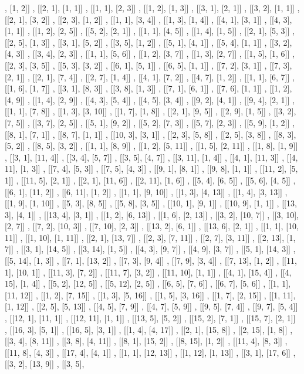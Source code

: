 \documentclass[a4paper, 12pt]{article}
\begin{document}
\begin{footnotesize}
[[1, 1], [1, 2]] , [[2, 1], [1, 1]] , [[1, 1], [2, 3]] , [[1, 2], [1, 3]] , [[3, 1], [2, 1]] , [[3, 2], [1, 1]] , [[2, 1], [3, 2]] , [[2, 3], [1, 2]] , [[1, 1], [3, 4]] , [[1, 3], [1, 4]] , [[4, 1], [3, 1]] , [[4, 3], [1, 1]] , [[1, 2], [2, 5]] , [[5, 2], [2, 1]] , [[1, 1], [4, 5]] , [[1, 4], [1, 5]] , [[2, 1], [5, 3]] , [[2, 5], [1, 3]] , [[3, 1], [5, 2]] , [[3, 5], [1, 2]] , [[5, 1], [4, 1]] , [[5, 4], [1, 1]] , [[3, 2], [4, 3]] , [[3, 4], [2, 3]] , [[1, 1], [5, 6]] , [[1, 2], [3, 7]] , [[1, 3], [2, 7]] , [[1, 5], [1, 6]] , [[2, 3], [3, 5]] , [[5, 3], [3, 2]] , [[6, 1], [5, 1]] , [[6, 5], [1, 1]] , [[7, 2], [3, 1]] , [[7, 3], [2, 1]] , [[2, 1], [7, 4]] , [[2, 7], [1, 4]] , [[4, 1], [7, 2]] , [[4, 7], [1, 2]] , [[1, 1], [6, 7]] , [[1, 6], [1, 7]] , [[3, 1], [8, 3]] , [[3, 8], [1, 3]] , [[7, 1], [6, 1]] , [[7, 6], [1, 1]] , [[1, 2], [4, 9]] , [[1, 4], [2, 9]] , [[4, 3], [5, 4]] , [[4, 5], [3, 4]] , [[9, 2], [4, 1]] , [[9, 4], [2, 1]] , [[1, 1], [7, 8]] , [[1, 3], [3, 10]] , [[1, 7], [1, 8]] , [[2, 1], [9, 5]] , [[2, 9], [1, 5]] , [[3, 2], [7, 5]] , [[3, 7], [2, 5]] , [[5, 1], [9, 2]] , [[5, 2], [7, 3]] , [[5, 7], [2, 3]] , [[5, 9], [1, 2]] , [[8, 1], [7, 1]] , [[8, 7], [1, 1]] , [[10, 3], [3, 1]] , [[2, 3], [5, 8]] , [[2, 5], [3, 8]] , [[8, 3], [5, 2]] , [[8, 5], [3, 2]] , [[1, 1], [8, 9]] , [[1, 2], [5, 11]] , [[1, 5], [2, 11]] , [[1, 8], [1, 9]] , [[3, 1], [11, 4]] , [[3, 4], [5, 7]] , [[3, 5], [4, 7]] , [[3, 11], [1, 4]] , [[4, 1], [11, 3]] , [[4, 11], [1, 3]] , [[7, 4], [5, 3]] , [[7, 5], [4, 3]] , [[9, 1], [8, 1]] , [[9, 8], [1, 1]] , [[11, 2], [5, 1]] , [[11, 5], [2, 1]] , [[2, 1], [11, 6]] , [[2, 11], [1, 6]] , [[5, 4], [6, 5]] , [[5, 6], [4, 5]] , [[6, 1], [11, 2]] , [[6, 11], [1, 2]] , [[1, 1], [9, 10]] , [[1, 3], [4, 13]] , [[1, 4], [3, 13]] , [[1, 9], [1, 10]] , [[5, 3], [8, 5]] , [[5, 8], [3, 5]] , [[10, 1], [9, 1]] , [[10, 9], [1, 1]] , [[13, 3], [4, 1]] , [[13, 4], [3, 1]] , [[1, 2], [6, 13]] , [[1, 6], [2, 13]] , [[3, 2], [10, 7]] , [[3, 10], [2, 7]] , [[7, 2], [10, 3]] , [[7, 10], [2, 3]] , [[13, 2], [6, 1]] , [[13, 6], [2, 1]] , [[1, 1], [10, 11]] , [[1, 10], [1, 11]] , [[2, 1], [13, 7]] , [[2, 3], [7, 11]] , [[2, 7], [3, 11]] , [[2, 13], [1, 7]] , [[3, 1], [14, 5]] , [[3, 14], [1, 5]] , [[4, 3], [9, 7]] , [[4, 9], [3, 7]] , [[5, 1], [14, 3]] , [[5, 14], [1, 3]] , [[7, 1], [13, 2]] , [[7, 3], [9, 4]] , [[7, 9], [3, 4]] , [[7, 13], [1, 2]] , [[11, 1], [10, 1]] , [[11, 3], [7, 2]] , [[11, 7], [3, 2]] , [[11, 10], [1, 1]] , [[4, 1], [15, 4]] , [[4, 15], [1, 4]] , [[5, 2], [12, 5]] , [[5, 12], [2, 5]] , [[6, 5], [7, 6]] , [[6, 7], [5, 6]] , [[1, 1], [11, 12]] , [[1, 2], [7, 15]] , [[1, 3], [5, 16]] , [[1, 5], [3, 16]] , [[1, 7], [2, 15]] , [[1, 11], [1, 12]] , [[2, 5], [5, 13]] , [[4, 5], [7, 9]] , [[4, 7], [5, 9]] , [[9, 5], [7, 4]] , [[9, 7], [5, 4]] , [[12, 1], [11, 1]] , [[12, 11], [1, 1]] , [[13, 5], [5, 2]] , [[15, 2], [7, 1]] , [[15, 7], [2, 1]] , [[16, 3], [5, 1]] , [[16, 5], [3, 1]] , [[1, 4], [4, 17]] , [[2, 1], [15, 8]] , [[2, 15], [1, 8]] , [[3, 4], [8, 11]] , [[3, 8], [4, 11]] , [[8, 1], [15, 2]] , [[8, 15], [1, 2]] , [[11, 4], [8, 3]] , [[11, 8], [4, 3]] , [[17, 4], [4, 1]] , [[1, 1], [12, 13]] , [[1, 12], [1, 13]] , [[3, 1], [17, 6]] , [[3, 2], [13, 9]] , [[3, 5], 
\end{footnotesize}
\end{document}
